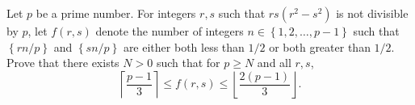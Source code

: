 Let $p$ be a prime number. For integers $r,s$ such that $rs\left(r^2-s^2\right)$ is not divisible by $p$, let $f\left(r,s\right)$ denote the number of integers $n\in\left\{1,2,\ldots,p-1\right\}$ such that $\left\{rn/p\right\}$ and $\left\{sn/p\right\}$ are either both less than $1/2$ or both greater than $1/2$. Prove that there exists $N>0$ such that for $p\geq N$ and all $r,s$, \[\left\lceil\frac{p-1}{3}\right\rceil\leq f\left(r,s\right)\leq\left\lfloor\frac{2\left(p-1\right)}{3}\right\rfloor.\]